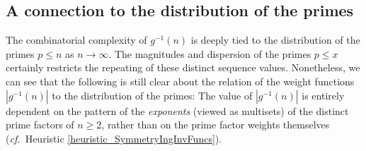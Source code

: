 \documentclass[11pt,reqno,a4letter]{article}
\numberwithin{figure}{section}
\numberwithin{table}{section}
\newcommand{\cf}{\textit{cf.\ }}
\theoremstyle{plain}
\numberwithin{theorem}{section}
\theoremstyle{definition}
\begin{document}
\subsection{A connection to the distribution of the primes} 
\label{subSection_AConnectionToDistOfThePrimes} 

The combinatorial complexity of $g^{-1}(n)$ is deeply tied to the distribution of the primes 
$p \leq n$ as $n \rightarrow \infty$. 
The magnitudes and dispersion of the primes $p \leq x$ certainly restricts the 
repeating of these distinct sequence values. 
Nonetheless, we can see that the following 
is still clear about the relation of the weight functions $|g^{-1}(n)|$ to the 
distribution of the primes: 
The value of $|g^{-1}(n)|$ is entirely dependent on the pattern of the \emph{exponents} 
(viewed as multisets) of the distinct prime factors of $n \geq 2$, rather than on the 
prime factor weights themselves 
(\cf Heuristic \ref{heuristic_SymmetryIngInvFuncs}). 
\end{document}
